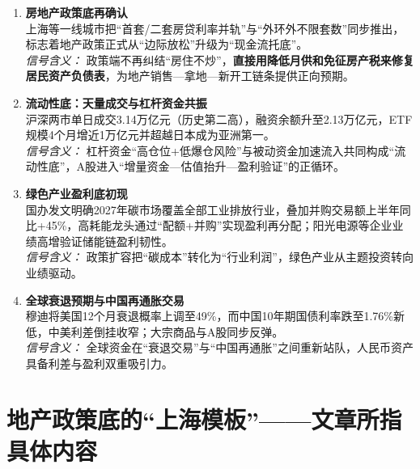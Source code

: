 \begin{enumerate}[leftmargin=*, nosep]
    \item \textbf{房地产政策底再确认}  \\
    上海等一线城市把“首套/二套房贷利率并轨”与“外环外不限套数”同步推出，标志着地产政策正式从“边际放松”升级为“现金流托底”。  \\
    \textit{信号含义：} 政策端不再纠结“房住不炒”，{\color{red}\textbf{直接用降低月供和免征房产税来修复居民资产负债表}}，为地产销售—拿地—新开工链条提供正向预期。

    \item \textbf{流动性底：天量成交与杠杆资金共振}  \\
    沪深两市单日成交3.14万亿元（历史第二高），融资余额升至2.13万亿元，ETF规模4个月增近1万亿元并超越日本成为亚洲第一。  \\
    \textit{信号含义：} 杠杆资金“高仓位+低爆仓风险”与被动资金加速流入共同构成“流动性底”，A股进入“增量资金—估值抬升—盈利验证”的正循环。

    \item \textbf{绿色产业盈利底初现}  \\
    国办发文明确2027年碳市场覆盖全部工业排放行业，叠加并购交易额上半年同比+45\%，高耗能龙头通过“配额+并购”实现盈利再分配；阳光电源等企业业绩高增验证储能链盈利韧性。  \\
    \textit{信号含义：} 政策扩容把“碳成本”转化为“行业利润”，绿色产业从主题投资转向业绩驱动。

    \item \textbf{全球衰退预期与中国再通胀交易}  \\
    穆迪将美国12个月衰退概率上调至49\%，而中国10年期国债利率跌至1.76\%新低，中美利差倒挂收窄；大宗商品与A股同步反弹。  \\   
    \textit{信号含义：} 全球资金在“衰退交易”与“中国再通胀”之间重新站队，人民币资产具备利差与盈利双重吸引力。
\end{enumerate}

        

\section{地产政策底的“上海模板”——文章所指具体内容}

